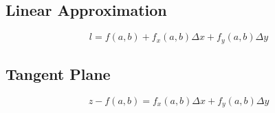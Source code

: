   \subsection{Linear Approximation}

    \begin{equation}
      l = f\left( a, b \right)
        + f_{x} \left( a, b \right) \Delta x
        + f_{y} \left( a, b \right) \Delta y
    \end{equation}

  \subsection{Tangent Plane}

    \begin{equation}
      z - f\left( a, b \right)
        = f_{x} \left( a, b \right) \Delta x
        + f_{y} \left( a, b \right) \Delta y
    \end{equation}